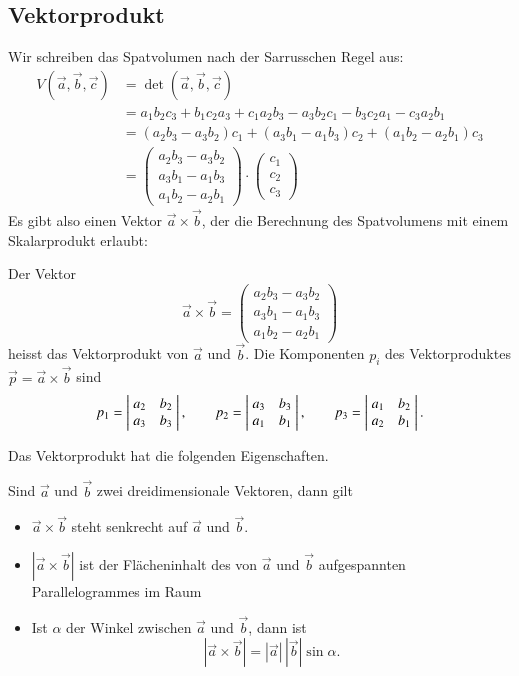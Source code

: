 \subsection{Vektorprodukt}
Wir schreiben das Spatvolumen nach der Sarrusschen Regel aus:
\begin{align*}
V(\vec a,\vec b,\vec c)&=\det(\vec a,\vec b,\vec c)\\
&=
a_1b_2c_3+b_1c_2a_3+c_1a_2b_3
-a_3b_2c_1-b_3c_2a_1-c_3a_2b_1\\
&=
(a_2b_3-a_3b_2)c_1+(a_3b_1-a_1b_3)c_2+(a_1b_2-a_2b_1)c_3
\\
&=
\begin{pmatrix}
a_2b_3-a_3b_2\\
a_3b_1-a_1b_3\\
a_1b_2-a_2b_1
\end{pmatrix}
\cdot
\begin{pmatrix}
c_1\\c_2\\c_3
\end{pmatrix}
\end{align*}
Es gibt also einen Vektor $\vec a\times\vec b$, der die Berechnung
des Spatvolumens mit einem Skalarprodukt erlaubt:
\begin{definition}
Der Vektor
\[
\vec a\times\vec b= \begin{pmatrix}
a_2b_3-a_3b_2\\
a_3b_1-a_1b_3\\
a_1b_2-a_2b_1
\end{pmatrix}
\]
heisst das Vektorprodukt von $\vec a$ und $\vec b$.
Die Komponenten $p_i$
des Vektorproduktes $\vec p=\vec a\times \vec b$ sind
\[
p_1
=
\left|\;\begin{matrix}
a_2&b_2\\a_3&b_3
\end{matrix}\;\right|\\
,\qquad p_2=
\left|\;\begin{matrix}
a_3&b_3\\a_1&b_1
\end{matrix}\;\right|\\
,\qquad p_3=
\left|\;\begin{matrix}
a_1&b_2\\a_2&b_1
\end{matrix}\;\right|.
\]
\end{definition}
Das Vektorprodukt hat die folgenden Eigenschaften.
\begin{satz}
Sind $\vec a$ und $\vec b$ zwei dreidimensionale Vektoren, dann gilt
\begin{itemize}
\item $\vec a\times\vec b$ steht senkrecht auf $\vec a$ und $\vec b$.
\item $|\vec a\times\vec b|$ ist der Flächeninhalt des von
$\vec a$ und $\vec b$ aufgespannten Parallelogrammes im Raum
\item Ist $\alpha$ der Winkel zwischen $\vec a$ und $\vec b$, dann
ist
\[
|\vec a\times\vec b|=|\vec a|\,|\vec b|\sin \alpha.
\]
\end{itemize}
\end{satz}
